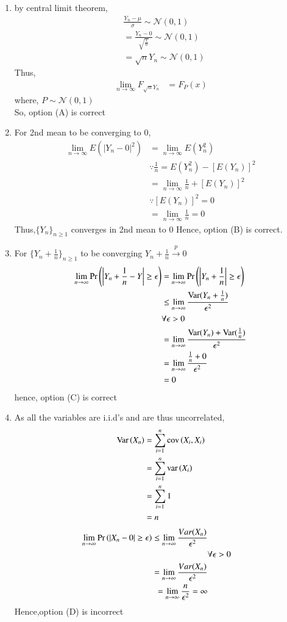 \documentclass[journal,12pt,Twocolumn]{IEEEtran}
\theoremstyle{remark}
\begin{document}
\begin{enumerate}[label=(\Alph*)]
\item by central limit theorem,
\begin{align}
&\frac{Y_n-\mu}{\sigma} \sim \mathcal{N}(0,1) \\
&= \frac{Y_n-0}{\sqrt{\frac{1}{n}}} \sim \mathcal{N}(0,1) \\
&= \sqrt{n}Y_n \sim \mathcal{N}(0,1)  
\end{align}
Thus,
\begin{align}
\lim_{n \to \infty} F_{\sqrt{n}Y_n} 
&=F_P(x)
\end{align}
where, $P \sim \mathcal{N}(0,1)$ \\
So, option (A) is correct\
\item For 2nd mean to be converging to 0,
\begin{align}
\lim_{n \to \infty} E(|Y_n-0|^2)&=\lim_{n \to \infty} E(Y_n^2) \\
&\because \frac{1}{n} = E(Y_n^2) - [E(Y_n)]^2 \\
&=\lim_{n \to \infty} \frac{1}{n} + [E(Y_n)]^2 \\
&\because [E(Y_n)]^2 = 0 \\
&=\lim_{n \to \infty} \frac{1}{n} = 0 
\end{align}
Thus,$\{Y_n\}_{n \geq 1}$ converges in 2nd mean to 0
Hence, option (B) is correct.
\item For $\{Y_n+\frac{1}{n}\}_{n \geq 1}$ to be converging $Y_n +\frac{1}{n} \xrightarrow{p} 0$ \\
\begin{align}
\lim_{n \to \infty} \Pr\left(\left|Y_n +\frac{1}{n}-Y\right| \geq  \epsilon\right) 
&=\lim_{n \to \infty} \Pr\left(\left|Y_n +\frac{1}{n}\right| \geq  \epsilon\right) \\ 
&\leq \lim_{n \to \infty} \frac{\text{Var}(Y_n +\frac{1}{n})}{\epsilon^2} \\
& \forall \epsilon > 0 \\
&=\lim_{n \to \infty} \frac{\text{Var}(Y_n)+\text{Var}(\frac{1}{n})}{\epsilon^2} \\
&=\lim_{n \to \infty} \frac{\frac{1}{n}+0}{\epsilon^2} \\
&= 0
\end{align}
hence, option (C) is correct 
\item 
As all the variables are i.i.d's and are thus uncorrelated,
\begin{align}
\text{Var}\left(X_n\right)&=\sum_{i=1}^{n}\text{cov}\left(X_i, X_i\right) \\
&= \sum_{i=1}^{n} \text{var}\left(X_i\right)\\
&= \sum_{i=1}^{n} 1\\
&= n
\end{align}
\begin{align}
\lim_{n \to \infty} \Pr\left(|X_n-0| \geq  \epsilon\right)  
\leq \lim_{n \to \infty} \frac{Var(X_n)}{\epsilon^2} \\
& \forall \epsilon > 0 \\
=\lim_{n \to \infty} \frac{Var(X_n)}{\epsilon^2} \\
=\lim_{n \to \infty} \frac{n}{\epsilon^2} = \infty
\end{align} 
Hence,option (D) is incorrect
\end{enumerate}
\end{document}
